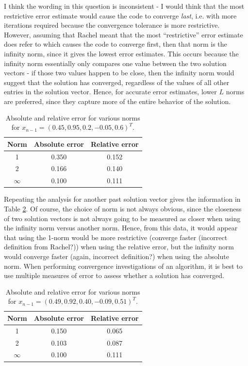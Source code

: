 \documentclass[10pt]{article}
\begin{document}
I think the wording in this question is inconsistent - I would think that the most restrictive error estimate would cause the code to converge \textit{last}, i.e. with more iterations required because the convergence tolerance is more restrictive. However, assuming that Rachel meant that the most ``restrictive'' error estimate does refer to which causes the code to converge first, then that norm is the infinity norm, since it gives the lowest error estimates. This occurs because the infinity norm essentially only compares one value between the two solution vectors - if those two values happen to be close, then the infinity norm would suggest that the solution has converged, regardless of the values of all other entries in the solution vector. Hence, for accurate error estimates, lower \(L\) norms are preferred, since they capture more of the entire behavior of the solution.

\begin{table}[H]
\caption{Absolute and relative error for various norms for \(x_{n-1}=(0.45, 0.95, 0.2, -0.05, 0.6)^T\).}
\centering
\begin{tabular}{c c c}
\hline\hline
Norm & Absolute error & Relative error\\ [0.5ex]
\hline
1 & 0.350 & 0.152\\
2 & 0.166 & 0.140\\
\(\infty\) & 0.100 & 0.111\\
\hline
\end{tabular}
\label{table:3}
\end{table}

Repeating the analysis for another past solution vector gives the information in Table \ref{table:4}. Of course, the choice of norm is not always obvious, since the closeness of two solution vectors is not always going to be measured as closer when using the infinity norm versus another norm. Hence, from this data, it would appear that using the 1-norm would be more restrictive (converge faster (incorrect definition from Rachel?)) when using the relative error, but the infinity norm would converge faster (again, incorrect definition?) when using the absolute norm. When performing convergence investigations of an algorithm, it is best to use multiple measures of error to assess whether a solution has converged.

\begin{table}[H]
\caption{Absolute and relative error for various norms for \(x_{n-1}=(0.49, 0.92, 0.40, -0.09, 0.51)^T\).}
\centering
\begin{tabular}{c c c}
\hline\hline
Norm & Absolute error & Relative error\\ [0.5ex]
\hline
1 & 0.150 & 0.065\\
2 & 0.103 & 0.087\\
\(\infty\) & 0.100 & 0.111\\
\hline
\end{tabular}
\label{table:4}
\end{table}
\end{document}

